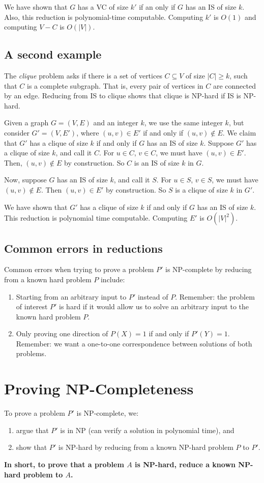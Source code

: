 \documentclass[titlepage, 12pt, leqno]{article}
\begin{document}
We have shown that $G$ has a VC of size $k'$ if an only if $G$ has an IS of size
$k$. Also, this reduction is polynomial-time computable. Computing $k'$ is 
$O(1)$ and computing $V-C$ is $O(|V|)$.

\subsection{A second example}
The \textit{clique} problem asks if there is a set of vertices $C \subseteq V$ of
size $|C| \ge k$, such that $C$ is a complete subgraph. That is, every pair of
vertices in $C$ are connected by an edge. Reducing from IS to clique shows that
clique is NP-hard if IS is NP-hard.

Given a graph $G = (V,E)$ and an integer $k$, we use the same integer $k$, but
consider $G' = (V,E')$, where $(u,v) \in E'$ if and only if $(u,v) \notin E$.
We claim that $G'$ has a clique of size $k$ if and only if $G$ has an IS of
size $k$. Suppose $G'$ has a clique of size $k$, and call it $C$. For
$u \in C$, $v \in C$, we must have $(u,v) \in E'$. Then, $(u,v) \notin E$ by
construction. So $C$ is an IS of size $k$ in $G$.

Now, suppose $G$ has an IS of size $k$, and call it $S$. For $u \in S$, $v \in 
S$, we must have $(u,v) \notin E$. Then $(u,v) \in E'$ by construction. So
$S$ is a clique of size $k$ in $G'$.

We have shown that $G'$ has a clique of size $k$ if and only if $G$ has an IS of
size $k$. This reduction is polynomial time computable. Computing $E'$ is
$O(|V|^{2})$.

\subsection{Common errors in reductions}
Common errors when trying to prove a problem $P'$ is NP-complete by reducing
from a known hard problem $P$ include:
\begin{enumerate}
    \item Starting from an arbitrary input to $P'$ instead of $P$. Remember:
        the problem of interest $P'$ is hard if it would allow us to solve an
        arbitrary input to the known hard problem $P$.
    \item Only proving one direction of $P(X) = 1$ if and only if $P'(Y)=1$.
        Remember: we want a one-to-one correspondence between solutions of
        both problems.
\end{enumerate}

\pagebreak
\section{Proving NP-Completeness}
To prove a problem $P'$ is NP-complete, we:
\begin{enumerate}
    \item argue that $P'$ is in NP (can verify a solution in polynomial time), 
        and
    \item show that $P'$ is NP-hard by reducing from a known NP-hard problem
        $P$ to $P'$.
\end{enumerate}
\textbf{In short, to prove that a problem $A$ is NP-hard, reduce a known NP-hard
problem to $A$.}
\end{document}
